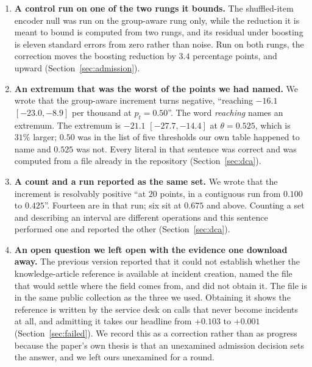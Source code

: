 \documentclass[preprint,12pt]{elsarticle}
\begin{document}
\begin{enumerate}
\item \textbf{A control run on one of the two rungs it bounds.} The
shuffled-item encoder null was run on the group-aware rung only, while the
reduction it is meant to bound is computed from two rungs, and its residual
under boosting is eleven standard errors from zero rather than noise. Run on
both rungs, the correction moves the boosting reduction by $3.4$ percentage
points, and upward (Section~\ref{sec:admission}).

\item \textbf{An extremum that was the worst of the points we had named.} We
wrote that the group-aware increment turns negative, ``reaching $-16.1$
$[-23.0,-8.9]$ per thousand at $p_t=0.50$''. The word \emph{reaching} names an
extremum. The extremum is $-21.1$ $[-27.7,-14.4]$ at $\theta=0.525$, which is
$31\%$ larger; $0.50$ was in the list of five thresholds our own table
happened to name and $0.525$ was not. Every literal in that sentence was
correct and was computed from a file already in the repository
(Section~\ref{sec:dca}).

\item \textbf{A count and a run reported as the same set.} We wrote that the
increment is resolvably positive ``at $20$ points, in a contiguous run from
$0.100$ to $0.425$''. Fourteen are in that run; six sit at $0.675$ and above.
Counting a set and describing an interval are different operations and this
sentence performed one and reported the other (Section~\ref{sec:dca}).

\item \textbf{An open question we left open with the evidence one download
away.} The previous version reported that it could not establish whether the
knowledge-article reference is available at incident creation, named the file
that would settle where the field comes from, and did not obtain it. The file
is in the same public collection as the three we used. Obtaining it shows the
reference is written by the service desk on calls that never become incidents
at all, and admitting it takes our headline from $+0.103$ to $+0.001$
(Section~\ref{sec:failed}). We record this as a correction rather than as
progress because the paper's own thesis is that an unexamined admission
decision sets the answer, and we left ours unexamined for a round.


\end{enumerate}
\end{document}
